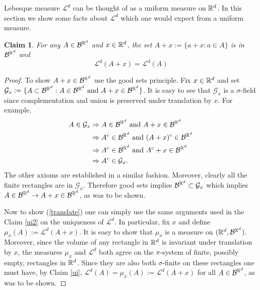 \documentclass[10pt,letterpaper,twocolumn]{article}
\newtheorem{claim}{Claim}
\begin{document}
Lebesque measure $\mathcal L^d$ can be thought of as a uniform measure on $\Bbb R^d$. In this section we show some facts about $\mathcal L^d$ which one would expect from a uniform measure.
\begin{claim}
For any $A\in\mathcal B^{\Bbb R^d }$ and $x\in \Bbb R^d$, the set $A+x:= \{ a+x: a\in A\}$ is in $\mathcal B^{\Bbb R^d }$ and
\begin{equation}
 \label{translate}
 \mathcal L^d(A+x) =  \mathcal L^d(A)
 \end{equation}
\end{claim}
\begin{proof}
To show $A+x \in\mathcal B^{\Bbb R^d }$ use the good sets principle. Fix $x\in \Bbb R^d$ and set   $\mathcal G_x:=\{ A\subset \mathcal B^{\Bbb R^d }: A\in \mathcal B^{\Bbb R^d } \text{  and } A+x \in \mathcal B^{\Bbb R^d }\}$.
It is easy to see that $\mathcal G_x$ is a $\sigma$-field since complementation and union is preserved under translation by $x$. For example,
\begin{align*}
A\in\mathcal G_x &\Rightarrow  A\in \mathcal B^{\Bbb R^d } \text{  and } A+x \in \mathcal B^{\Bbb R^d } \\
&\Rightarrow  A^c\in \mathcal B^{\Bbb R^d } \text{  and } (A+x)^c \in \mathcal B^{\Bbb R^d } \\
&\Rightarrow  A^c\in \mathcal B^{\Bbb R^d } \text{  and } A^c+x \in \mathcal B^{\Bbb R^d } \\
&\Rightarrow A^c\in\mathcal G_x.
\end{align*}
The other axioms are established in a similar fashion.
Moreover, clearly all the finite rectangles are in $\mathcal G_x$. Therefore good sets implies $\mathcal B^{\Bbb R^d } \subset \mathcal G_x$  which implies $A\in \mathcal B^{\Bbb R^d }\rightarrow A+x \in \mathcal B^{\Bbb R^d }$, as was to be shown.

Now to show (\ref{translate}) one can simply use the same arguments used in the Claim \ref{ui2} on the uniqueness of $\mathcal L^d$. In particular, fix $x$ and define $\mu_x(A):= \mathcal L^d(A+x)$. It is easy to show that $\mu_x$ is a measure on $(\Bbb R^d, \mathcal B^{\Bbb R^d })$. Moreover, since the volume of any rectangle in $\Bbb R^d$ is invariant under translation by $x$, the measures $\mu_x$ and $\mathcal L^d$ both agree on the $\pi$-system of finite, possibly empty, rectangles in $\Bbb R^d$. Since they are also both $\sigma$-finite on these rectangles one must have, by Claim \ref{ui}, $\mathcal L^d(A) =\mu_x(A):= \mathcal L^d(A+x) $ for all $A\in\mathcal B^{\Bbb R^d }$, as was to be shown.
\end{proof}
\end{document}
